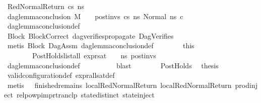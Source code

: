 \begin{isabellebody}
\ {\isacharparenleft}{\kern0pt}RedNormalReturn\ cs\ ns{}{\isacharprime}{\kern0pt}{\isacharparenright}{\kern0pt}\isanewline
\ \ \ \ \ \ \isamarkupfalse%
\ {\isachardoublequoteopen}dag{\isacharunderscore}{\kern0pt}lemma{\isacharunderscore}{\kern0pt}conclusion\ M\ {\isasymLambda}\ {\isasymGamma}\ {\isasymOmega}\ post{\isacharunderscore}{\kern0pt}invs\ cs{}\ ns{}\ {\isacharparenleft}{\kern0pt}Normal\ ns{}{\isacharprime}{\kern0pt}{\isacharparenright}{\kern0pt}\ c{\isachardoublequoteclose}\isanewline
\ \ \ \ \ \ \ \ \isamarkupfalse%
\ dag{\isacharunderscore}{\kern0pt}lemma{\isacharunderscore}{\kern0pt}conclusion{\isacharunderscore}{\kern0pt}def\isanewline
\ \ \ \ \ \ \ \ \isamarkupfalse%
\ Block\ BlockCorrect\ dag{\isacharunderscore}{\kern0pt}verifies{\isacharunderscore}{\kern0pt}propagate{\isacharunderscore}{\kern0pt}{}\ DagVerifies\isanewline
\ \ \ \ \ \ \ \ \isamarkupfalse%
\ {\isacharparenleft}{\kern0pt}metis\ Block{}\ DagAssm\ dag{\isacharunderscore}{\kern0pt}lemma{\isacharunderscore}{\kern0pt}conclusion{\isacharunderscore}{\kern0pt}def{\isacharparenright}{\kern0pt}\isanewline
\ \ \ \ \ \ \isamarkupfalse%
\ this\ \isamarkupfalse%
\isanewline
\ \ \ \ \ \ \ \ PostHolds{\isacharcolon}{\kern0pt}{\isachardoublequoteopen}list{\isacharunderscore}{\kern0pt}all\ {\isacharparenleft}{\kern0pt}expr{\isacharunderscore}{\kern0pt}sat\ {\isasymLambda}\ {\isasymGamma}\ {\isasymOmega}\ ns{}{\isacharprime}{\kern0pt}{\isacharparenright}{\kern0pt}\ post{\isacharunderscore}{\kern0pt}invs{\isachardoublequoteclose}\isanewline
\ \ \ \ \ \ \ \ \isamarkupfalse%
\ dag{\isacharunderscore}{\kern0pt}lemma{\isacharunderscore}{\kern0pt}conclusion{\isacharunderscore}{\kern0pt}def\isanewline
\ \ \ \ \ \ \ \ \isamarkupfalse%
\ blast\isanewline
\ \ \ \ \ \ \isamarkupfalse%
\ PostHolds\ \isamarkupfalse%
\ {\isacharquery}{\kern0pt}thesis\ \isanewline
\ \ \ \ \ \ \ \ \isamarkupfalse%
\ valid{\isacharunderscore}{\kern0pt}configuration{\isacharunderscore}{\kern0pt}def\ expr{\isacharunderscore}{\kern0pt}all{\isacharunderscore}{\kern0pt}sat{\isacharunderscore}{\kern0pt}def\ \ \ \ \ \ \isanewline
\ \ \ \ \ \ \ \ \isamarkupfalse%
\ {\isacharparenleft}{\kern0pt}metis\ {\isachardoublequoteopen}{}{\isachardoublequoteclose}\ {\isacharparenleft}{\kern0pt}{}{\isacharparenright}{\kern0pt}\ finished{\isacharunderscore}{\kern0pt}remains\ local{\isachardot}{\kern0pt}RedNormalReturn{\isacharparenleft}{\kern0pt}{}{\isacharparenright}{\kern0pt}\ local{\isachardot}{\kern0pt}RedNormalReturn{\isacharparenleft}{\kern0pt}{}{\isacharparenright}{\kern0pt}\ prod{\isachardot}{\kern0pt}inject\ relpowp{\isacharunderscore}{\kern0pt}imp{\isacharunderscore}{\kern0pt}rtranclp\ state{\isachardot}{\kern0pt}distinct{\isacharparenleft}{\kern0pt}{}{\isacharparenright}{\kern0pt}\ state{\isachardot}{\kern0pt}inject{\isacharparenright}{\kern0pt}\isanewline

\end{isabellebody}
